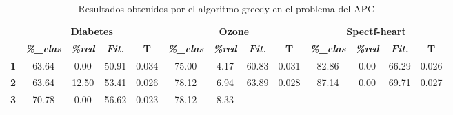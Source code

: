 \begin{table}[H]
	\centering
	\caption{Resultados obtenidos por el algoritmo greedy en el problema del APC												
	}
	\label{tab:Greedy}
	\begin{tabular}{ccccccccccccc}
		&
		\multicolumn{4}{c}{\cellcolor[HTML]{C0C0C0}\textbf{Diabetes}} &
		\multicolumn{4}{c}{\cellcolor[HTML]{C0C0C0}\textbf{Ozone}} &
		\multicolumn{4}{c}{\cellcolor[HTML]{C0C0C0}\textbf{Spectf-heart}} \\
		\multirow{-2}{*}{} &
		\cellcolor[HTML]{DAE8FC}\textit{\textbf{\%\_clas}} &
		\cellcolor[HTML]{DAE8FC}\textit{\textbf{\%red}} &
		\cellcolor[HTML]{DAE8FC}\textit{\textbf{Fit.}} &
		\cellcolor[HTML]{DAE8FC}\textbf{T} &
		\cellcolor[HTML]{DAE8FC}\textit{\textbf{\%\_clas}} &
		\cellcolor[HTML]{DAE8FC}\textit{\textbf{\%red}} &
		\cellcolor[HTML]{DAE8FC}\textit{\textbf{Fit.}} &
		\cellcolor[HTML]{DAE8FC}\textbf{T} &
		\cellcolor[HTML]{DAE8FC}\textit{\textbf{\%\_clas}} &
		\cellcolor[HTML]{DAE8FC}\textit{\textbf{\%red}} &
		\cellcolor[HTML]{DAE8FC}\textit{\textbf{Fit.}} &
		\cellcolor[HTML]{DAE8FC}\textbf{T} \\ \cline{2-13} 
		\multicolumn{1}{c|}{\cellcolor[HTML]{C0C0C0}\textbf{1}} &
		\multicolumn{1}{c|}{63.64} &
		\multicolumn{1}{c|}{0.00} &
		\multicolumn{1}{c|}{50.91} &
		\multicolumn{1}{c|}{0.034} &
		\multicolumn{1}{c|}{75.00} &
		\multicolumn{1}{c|}{4.17} &
		\multicolumn{1}{c|}{60.83} &
		\multicolumn{1}{c|}{0.031} &
		\multicolumn{1}{c|}{82.86} &
		\multicolumn{1}{c|}{0.00} &
		\multicolumn{1}{c|}{66.29} &
		\multicolumn{1}{c|}{0.026} \\ \cline{2-13} 
		\multicolumn{1}{c|}{\cellcolor[HTML]{C0C0C0}\textbf{2}} &
		\multicolumn{1}{c|}{63.64} &
		\multicolumn{1}{c|}{12.50} &
		\multicolumn{1}{c|}{53.41} &
		\multicolumn{1}{c|}{0.026} &
		\multicolumn{1}{c|}{78.12} &
		\multicolumn{1}{c|}{6.94} &
		\multicolumn{1}{c|}{63.89} &
		\multicolumn{1}{c|}{0.028} &
		\multicolumn{1}{c|}{87.14} &
		\multicolumn{1}{c|}{0.00} &
		\multicolumn{1}{c|}{69.71} &
		\multicolumn{1}{c|}{0.027} \\ \cline{2-13} 
		\multicolumn{1}{c|}{\cellcolor[HTML]{C0C0C0}\textbf{3}} &
		\multicolumn{1}{c|}{70.78} &
		\multicolumn{1}{c|}{0.00} &
		\multicolumn{1}{c|}{56.62} &
		\multicolumn{1}{c|}{0.023} &
		\multicolumn{1}{c|}{78.12} &
		\multicolumn{1}{c|}{8.33} &

\end{tabular}
\end{table}
